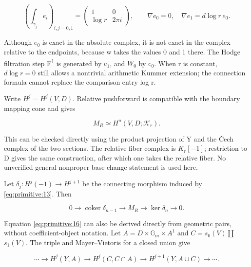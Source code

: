 \documentclass[11pt,a4paper,oneside]{article}
\theoremstyle{plain}
\theoremstyle{definition}
\theoremstyle{remark}
\numberwithin{equation}{section}
\begin{document}
\begin{equation}
\left(\int_{\gamma_j}e_i\right)_{i,j=0,1}
       =\begin{pmatrix}1&0\\\log r&2\pi i\end{pmatrix},\qquad
 \nabla e_0=0,\quad \nabla e_1=d\log r\,e_0.                    \label{eq:primitive:14}
\end{equation}

Although \(e_0\) is exact in the absolute complex, it is not exact in the complex relative to the endpoints, because w takes the values 0 and 1 there. The Hodge filtration step F\textsuperscript{1} is generated by \(e_1\), and \(W_0\) by \(e_0\). When r is constant, \(d\log  r=0\) still allows a nontrivial arithmetic Kummer extension; the connection formula cannot replace the comparison entry log r.

Write \(H^j=H^j(V,D)\). Relative pushforward is compatible with the boundary mapping cone and gives

\begin{equation}
M_R\simeq H^n(V,D;\mathcal K_r).               \label{eq:primitive:15}
\end{equation}

This can be checked directly using the product projection of Y and the \v{C}ech complex of the two sections. The relative fiber complex is \(K_r[- 1]\); restriction to D gives the same construction, after which one takes the relative fiber. No unverified general nonproper base-change statement is used here.

Let \(\delta _j:H^j(-1)\to H^{j+1}\) be the connecting morphism induced by \eqref{eq:primitive:13}. Then

\begin{equation}
0\longrightarrow\operatorname{coker}\delta_{n-1}
       \longrightarrow M_R\longrightarrow\ker\delta_n\longrightarrow0.
                                                                    \label{eq:primitive:16}
\end{equation}

Equation \eqref{eq:primitive:16} can also be derived directly from geometric pairs, without coefficient-object notation. Let \(A=D\times \mathbb G_m\times A^{1}\) and \(C=s_0(V)\)\ensuremath{\coprod}\(s_1(V)\). The triple and Mayer--Vietoris for a closed union give

\begin{equation}
\cdots\to H^j(Y,A)\to H^j(C,C\cap A)
             \to H^{j+1}(Y,A\cup C)\to\cdots .
\end{equation}
\end{document}
